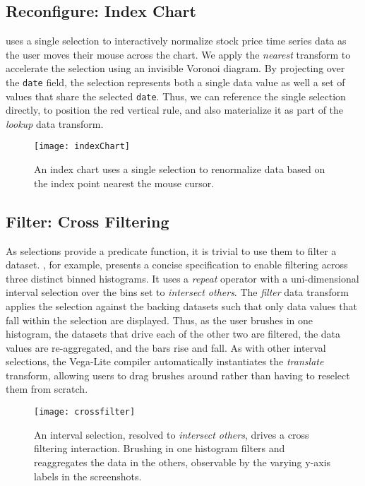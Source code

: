\subsection{Reconfigure: Index Chart}

 uses a single selection to interactively normalize
stock price time series data as the user moves their mouse across the chart. We
apply the \emph{nearest} transform to accelerate the selection using an
invisible Voronoi diagram. By projecting over the \texttt{date} field, the
selection represents both a single data value as well a set of values that share
the selected \texttt{date}. Thus, we can reference the single selection
directly, to position the red vertical rule, and also materialize it as part of
the \emph{lookup} data transform.

\begin{figure}[h!]
  \centering
  \texttt{[image: indexChart]}
  \caption{An index chart uses a single selection to renormalize data based
  on the index point nearest the mouse cursor.}
  \label{fig:vl:indexChart}
\end{figure}

\subsection{Filter: Cross Filtering}

As selections provide a predicate function, it is trivial to use them to filter
a dataset. , for example, presents a concise
specification to enable filtering across three distinct binned histograms. It
uses a \emph{repeat} operator with a uni-dimensional interval selection over the
bins set to \emph{intersect others}. The \emph{filter} data transform applies
the selection against the backing datasets such that only data values that fall
within the selection are displayed. Thus, as the user brushes in one histogram,
the datasets that drive each of the other two are filtered, the data values are
re-aggregated, and the bars rise and fall. As with other interval selections,
the Vega-Lite compiler automatically instantiates the \emph{translate}
transform, allowing users to drag brushes around rather than having to reselect
them from scratch.

\begin{figure}[h!]
  \centering
  \texttt{[image: crossfilter]}
  \caption{An interval selection, resolved to \emph{intersect others}, drives a
  cross filtering interaction. Brushing in one histogram filters and
  reaggregates the data in the others, observable by the varying y-axis labels
  in the screenshots.}
  \label{fig:vl:crossfilter}
\end{figure}

